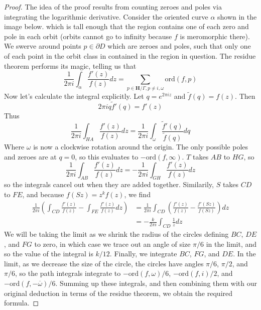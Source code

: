 \begin{proof}
    The idea of the proof results from counting zeroes and poles via integrating the logarithmic derivative. Consider the oriented curve $\alpha$ shown in the image below.
    which is tall enough that the region contains one of each zero and pole in each orbit (orbits cannot go to infinity because $f$ is meromorphic there). We swerve around points $p \in \partial D$ which are zeroes and poles, such that only one of each point in the orbit class in contained in the region in question. The residue theorem performs its magic, telling us that
    \[ \frac{1}{2\pi i} \int_\alpha \frac{f'(z)}{f(z)} dz = \sum_{p \in \mathbf{H}/\Gamma, p \neq i, \omega} \text{ord}(f,p) \]
    Now let's calculate the integral explicitly. Let $q = e^{2 \pi i z}$ and $\tilde{f}(q) = f(z)$. Then
    \[ 2 \pi i q \tilde{f}'(q) = f'(z)  \]
    Thus
    \[ \frac{1}{2 \pi i} \int_{HA} \frac{f'(z)}{f(z)} dz = \frac{1}{2 \pi i} \int_{\omega} \frac{\tilde{f}'(q)}{\tilde{f}(q)} dq \]
    Where $\omega$ is now a clockwise rotation around the origin. The only possible poles and zeroes are at $q = 0$, so this evaluates to $- \text{ord}(f,\infty)$. $T$ takes $AB$ to $HG$, so
    \[ \frac{1}{2 \pi i} \int_{AB} \frac{f'(z)}{f(z)} dz = - \frac{1}{2 \pi i} \int_{GH} \frac{f'(z)}{f(z)} dz \]
    so the integrals cancel out when they are added together. Similarily, $S$ takes $CD$ to $FE$, and because $f(Sz) = z^k f(z)$, we find
    \begin{align*}
        \frac{1}{2 \pi i} \left( \int_{CD} \frac{f'(z)}{f(z)} - \int_{FE} \frac{f'(z)}{f(z)} dz \right) &= \frac{1}{2 \pi i} \int_{CD} \left( \frac{f'(z)}{f(z)} - \frac{f'(Sz)}{f(Sz)} \right) dz\\
        &= -\frac{k}{2 \pi i} \int_{CD} \frac{1}{z} dz
    \end{align*}
    We will be taking the limit as we shrink the radius of the circles defining $BC$, $DE$, and $FG$ to zero, in which case we trace out an angle of size $\pi/6$ in the limit, and so the value of the integral is $k/12$. Finally, we integrate $BC$, $FG$, and $DE$. In the limit, as we decrease the size of the circle, the circles have angles $\pi/6$, $\pi/2$, and $\pi/6$, so the path integrals integrate to $- \text{ord}(f,\omega)/6$, $- \text{ord}(f,i)/2$, and $- \text{ord}(f, -\overline{\omega})/6$. Summing up these integrals, and then combining them with our original deduction in terms of the residue theorem, we obtain the required formula.
\end{proof}

